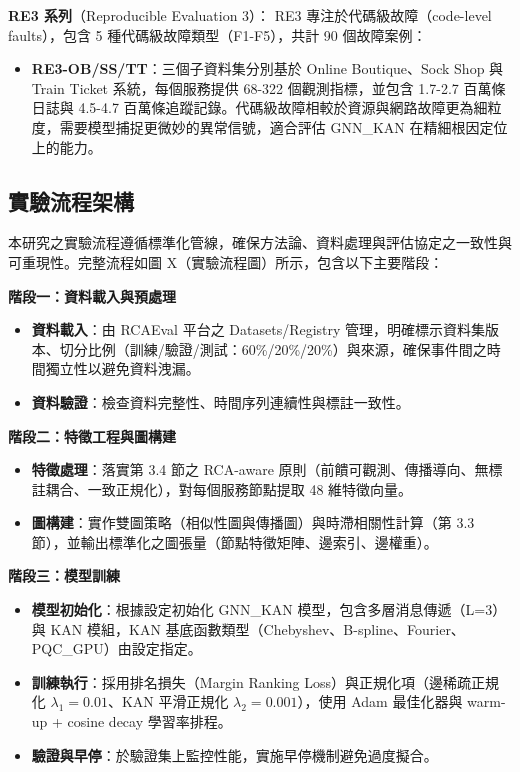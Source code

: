 \documentclass[10pt,a4paper,twocolumn]{article}
\begin{document}
\textbf{RE3 系列}（Reproducible Evaluation 3）：
RE3 專注於代碼級故障（code-level faults），包含 5 種代碼級故障類型（F1-F5），共計 90 個故障案例：
\begin{itemize}
\item \textbf{RE3-OB/SS/TT}：三個子資料集分別基於 Online Boutique、Sock Shop 與 Train Ticket 系統，每個服務提供 68-322 個觀測指標，並包含 1.7-2.7 百萬條日誌與 4.5-4.7 百萬條追蹤記錄。代碼級故障相較於資源與網路故障更為細粒度，需要模型捕捉更微妙的異常信號，適合評估 GNN\_KAN 在精細根因定位上的能力。
\end{itemize}

\subsection{實驗流程架構}

本研究之實驗流程遵循標準化管線，確保方法論、資料處理與評估協定之一致性與可重現性。完整流程如圖 X（實驗流程圖）所示，包含以下主要階段：

\textbf{階段一：資料載入與預處理}
\begin{itemize}
\item \textbf{資料載入}：由 RCAEval 平台之 Datasets/Registry 管理，明確標示資料集版本、切分比例（訓練/驗證/測試：60\%/20\%/20\%）與來源，確保事件間之時間獨立性以避免資料洩漏。
\item \textbf{資料驗證}：檢查資料完整性、時間序列連續性與標註一致性。
\end{itemize}

\textbf{階段二：特徵工程與圖構建}
\begin{itemize}
\item \textbf{特徵處理}：落實第 3.4 節之 RCA-aware 原則（前饋可觀測、傳播導向、無標註耦合、一致正規化），對每個服務節點提取 48 維特徵向量。
\item \textbf{圖構建}：實作雙圖策略（相似性圖與傳播圖）與時滯相關性計算（第 3.3 節），並輸出標準化之圖張量（節點特徵矩陣、邊索引、邊權重）。
\end{itemize}

\textbf{階段三：模型訓練}
\begin{itemize}
\item \textbf{模型初始化}：根據設定初始化 GNN\_KAN 模型，包含多層消息傳遞（L=3）與 KAN 模組，KAN 基底函數類型（Chebyshev、B-spline、Fourier、PQC\_GPU）由設定指定。
\item \textbf{訓練執行}：採用排名損失（Margin Ranking Loss）與正規化項（邊稀疏正規化 $\lambda_1=0.01$、KAN 平滑正規化 $\lambda_2=0.001$），使用 Adam 最佳化器與 warm-up + cosine decay 學習率排程。
\item \textbf{驗證與早停}：於驗證集上監控性能，實施早停機制避免過度擬合。
\end{itemize}
\end{document}
